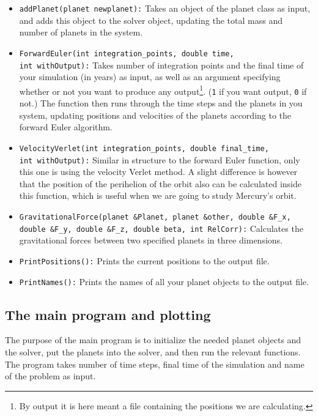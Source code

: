\documentclass[12pt, a4paper]{article}
\begin{document}
\begin{itemize}
\item \texttt{addPlanet(planet newplanet):} Takes an object of the planet class as input, and adds this 
object to the solver object, updating the total mass and number of planets in the system. 
\item \texttt{ForwardEuler(int integration\_points, double time,\\ int withOutput):} 
Takes number of integration points and the final time of your simulation (in years) as input, as well as 
an argument specifying whether or not you want to produce any output\footnote{By output it is here meant 
a file containing the positions we are calculating.}. (\texttt{1} if you want output, \texttt{0} if not.)
The function then runs through the time steps and the planets in you system, updating positions and 
velocities of the planets according to the forward Euler algorithm.
 
\item \texttt{VelocityVerlet(int integration\_points, double final\_time, \\ int withOutput):} Similar 
in structure to the forward Euler function, only this one is using the velocity Verlet method. A slight 
difference is however that the position of the perihelion of the orbit also can be calculated inside 
this function, which is useful when we are going to study Mercury's orbit. 
\item \texttt{GravitationalForce(planet \&Planet, planet \&other, double \&F\_x, \\ double \&F\_y, 
double \&F\_z, double beta, int RelCorr):} Calculates the gravitational forces between two specified 
planets in three dimensions.  
\item \texttt{PrintPositions():} Prints the current positions to the output file.    
\item \texttt{PrintNames():} Prints the names of all your planet objects to the output file. 
\end{itemize} 

\subsection{The main program and plotting}

The purpose of the main program is to initialize the needed planet objects and the solver, put the planets 
into the solver, and then run the relevant functions. The program takes number of time steps, 
final time of the simulation and name of the problem as input. 
\end{document}
